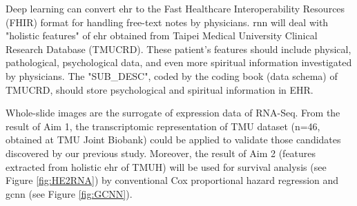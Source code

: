 \documentclass[12pt, a4paper]{article}
\begin{document}
Deep learning can convert \acrfull{ehr} to the Fast Healthcare Interoperability Resources (FHIR) format\citep{Rajkomar2018}\citep{HealthLevelSeven2019} for handling free-text notes by physicians.
\acrfull{rnn} will deal with "holistic features" of \acrshort{ehr} obtained from Taipei Medical University Clinical Research Database (TMUCRD).
These patient's features should include physical, pathological, psychological data, and even more spiritual information investigated by physicians.
The "SUB\_DESC", coded by the coding book (data schema) of TMUCRD, should store psychological and spiritual information in EHR.









Whole-slide images are the surrogate of expression data of RNA-Seq.
From the result of Aim 1, the transcriptomic representation of TMU dataset (n=46, obtained at TMU Joint Biobank) could be applied to validate those candidates discovered by our previous study.
Moreover, the result of Aim 2 (features extracted from holistic \acrshort{ehr} of TMUH) will be used for survival analysis (see Figure \ref{fig:HE2RNA}) by conventional Cox proportional hazard regression and \acrshort{gcnn} (see Figure \ref{fig:GCNN}). %
\end{document}
